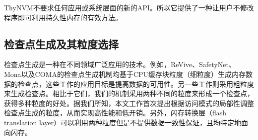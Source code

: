 
ThyNVM不要求任何应用或系统层面的新的API。所以它提供了一种让用户不修改程序即可利用持久性内存的有效方法。



\subsection{检查点生成及其粒度选择}
检查点生成是一种在不同领域广泛应用的技术\cite{466999, 5645453}。例如，ReVive\cite{1003567}、SafetyNet\cite{1003568}、
Mona\cite{Gao:2015:RIC}以及COMA\cite{1563035}的检查点生成机制均基于CPU缓存块粒度（细粒度）生成内存数据的检查点，这些工作的应用目标是提高数据的可用性。另一些工作\cite{6468462, Oliner:2006:CCR:1183401.1183406,
Rajachandrasekar:2014:MDC:2600212.2600713}则采用粗粒度来生成检查点。相比于它们，我们的机制采用两种不同的粒度来形成一个检查点，获得多种粒度的好处。据我们所知，本文工作首次提出根据访问模式的局部性调整检查点生成的粒度，从而实现高性能和低开销。另外，闪存转换层（flash translation layer）可以利用两种粒度\cite{Kang:2006:SFT:1176887.1176911,
Lee:2007:LBF:1275986.1275990}但是不提供数据一致性保证，且均特定地面向闪存。

